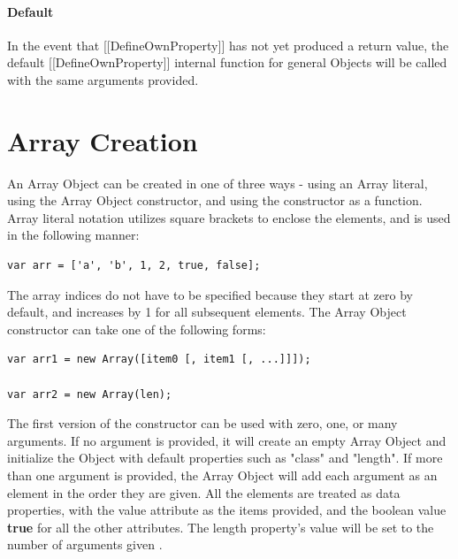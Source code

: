 \documentclass[a4paper,11pt,twoside]{report}
\begin{document}
\paragraph{Default}
In the event that [[DefineOwnProperty]] has not yet produced a return value, the default [[DefineOwnProperty]] internal function for general Objects will be called with the same arguments provided.

\section{Array Creation}\label{sec:arraycreate}
An Array Object can be created in one of three ways - using an Array literal, using the Array Object constructor, and using the constructor as a function. Array literal notation utilizes square brackets to enclose the elements, and is used in the following manner:

\begin{center}
\begin{minipage}{10cm}
\begin{lstlisting}
var arr = ['a', 'b', 1, 2, true, false];
\end{lstlisting}
\end{minipage}
\end{center}

The array indices do not have to be specified because they start at zero by default, and increases by 1 for all subsequent elements. The Array Object constructor can take one of the following forms:

\begin{center}
\begin{minipage}{10cm}
\begin{lstlisting}
var arr1 = new Array([item0 [, item1 [, ...]]]);

var arr2 = new Array(len);
\end{lstlisting}
\end{minipage}
\end{center}

The first version of the constructor can be used with zero, one, or many arguments. If no argument is provided, it will create an empty Array Object and initialize the Object with default properties such as "class" and "length". If more than one argument is provided, the Array Object will add each argument as an element in the order they are given. All the elements are treated as data properties, with the value attribute as the items provided, and the boolean value \textbf{true} for all the other attributes. The length property's value will be set to the number of arguments given \cite{EcmaScript}.
\end{document}
